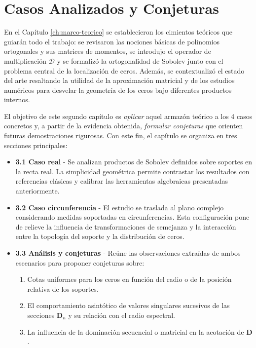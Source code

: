\chapter{Casos Analizados y Conjeturas}
\label{ch:caso_real}

En el Capítulo \ref{ch:marco-teorico} se establecieron los cimientos teóricos que guiarán todo el trabajo: se revisaron las nociones básicas de polinomios ortogonales y sus matrices de momentos, se introdujo el operador de multiplicación \(\mathcal{D}\) y se formalizó la ortogonalidad de Sobolev junto con el problema central de la localización de ceros. Además, se contextualizó el estado del arte resaltando la utilidad de la aproximación matricial y de los estudios numéricos para desvelar la geometría de los ceros bajo diferentes productos internos.

El objetivo de este segundo capítulo es \emph{aplicar} aquel armazón teórico a los 4 casos concretos y, a partir de la evidencia obtenida, \emph{formular conjeturas} que orienten futuras demostraciones rigurosas. Con este fin, el capítulo se organiza en tres secciones principales:

\begin{itemize}
	\item \textbf{3.1 Caso real} - Se analizan productos de Sobolev definidos sobre soportes en la recta real. La simplicidad geométrica permite contrastar los resultados con referencias clásicas y calibrar las herramientas algebraicas presentadas anteriormente.
	\item \textbf{3.2 Caso circunferencia} - El estudio se traslada al plano complejo considerando medidas soportadas en circunferencias. Esta configuración pone de relieve la influencia de transformaciones de semejanza y la interacción entre la topología del soporte y la distribución de ceros.
	\item \textbf{3.3 Análisis y conjeturas} - Reúne las observaciones extraídas de ambos escenarios para proponer conjeturas sobre:
	      \begin{enumerate}
		      \item Cotas uniformes para los ceros en función del radio o de la posición relativa de los soportes.
		      \item El comportamiento asintótico de valores singulares sucesivos de las secciones \(\mathbf{D}_n\) y su relación con el radio espectral.
		      \item La influencia de la dominación secuencial o matricial en la acotación de \(\mathbf{D}\).
	      \end{enumerate}
\end{itemize}

